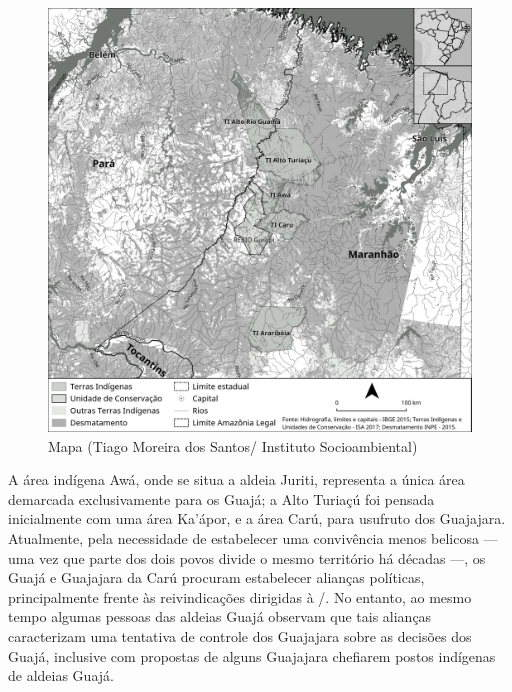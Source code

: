 \begin{figure}[H]
\centering
  \includegraphics[width=\textwidth]{./imgs/mapa_livro_uira}
\caption{Mapa (Tiago Moreira dos Santos/ Instituto Socioambiental)}
\end{figure}



A área indígena Awá, onde se situa a aldeia Juriti, representa a única
área demarcada exclusivamente para os Guajá; a  Alto Turiaçú foi
pensada inicialmente com uma área Ka'ápor, e a área Carú, para usufruto
dos Guajajara. Atualmente, pela necessidade de estabelecer uma
convivência menos belicosa --- uma vez que parte dos dois povos divide o
mesmo território há décadas ---, os Guajá e Guajajara da  Carú procuram
estabelecer alianças políticas, principalmente frente às reivindicações
dirigidas à /. No entanto, ao mesmo tempo algumas pessoas das
aldeias Guajá observam que tais alianças caracterizam uma tentativa de
controle dos Guajajara sobre as decisões dos Guajá, inclusive com
propostas de alguns Guajajara chefiarem postos indígenas de aldeias
Guajá.

